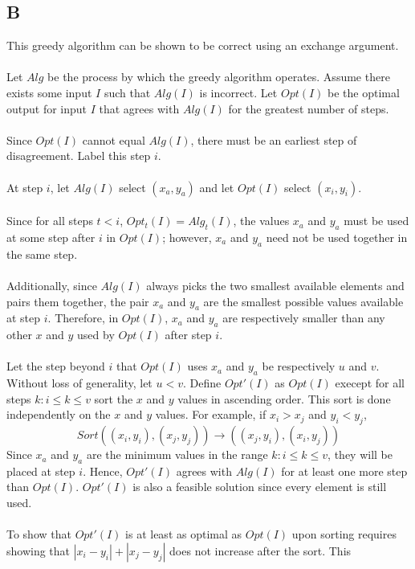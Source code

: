 \documentclass[12pt]{article}
\begin{document}
\subsection*{B}
This greedy algorithm can be shown to be correct using an
exchange argument.\\\\
Let $Alg$ be the process by which the greedy algorithm operates.
Assume there exists some input $I$ such that $Alg(I)$ is incorrect.
Let $Opt(I)$ be the optimal output for input $I$ that agrees with
$Alg(I)$ for the greatest number of steps.\\\\
Since $Opt(I)$ cannot equal $Alg(I)$, there must be an earliest
step of disagreement.  Label this step $i$.\\\\
At step $i$, let $Alg(I)$ select $(x_a, y_a)$ and let $Opt(I)$ select
$(x_i,y_i)$.\\\\
Since for all steps $t < i$, $Opt_t(I) = Alg_t(I)$, the values $x_a$ and
$y_a$ must be used at some step after $i$ in $Opt(I)$; however, $x_a$ and
$y_a$ need not be used together in the same step.\\\\
Additionally, since $Alg(I)$ always picks the two smallest available
elements and pairs them together, the pair $x_a$ and $y_a$ are the smallest
possible values available at step $i$.  Therefore, in $Opt(I)$, $x_a$ and
$y_a$ are respectively smaller than any other $x$ and $y$ used by $Opt(I)$
after step $i$.\\\\
Let the step beyond $i$ that $Opt(I)$ uses
$x_a$ and $y_a$ be respectively $u$ and $v$.  Without loss of generality,
let $u < v$.  Define $Opt'(I)$ as $Opt(I)$ execept for all steps $k: i \leq 
k \leq v$ sort the $x$ and $y$ values in ascending order.  This sort is done
independently on the $x$ and $y$ values.  For example, if $x_i > x_j$ and
$y_i < y_j$, \[Sort((x_i,y_i),(x_j,y_j))\to((x_j,y_i),(x_i,y_j))\]
Since $x_a$ and $y_a$
are the minimum values in the range $k: i \leq k \leq v$, they will be placed
at step $i$.  Hence, $Opt'(I)$ agrees with $Alg(I)$ for at least one more
step than $Opt(I)$.  $Opt'(I)$ is also a feasible solution since every element
is still used.\\\\
To show that $Opt'(I)$ is at least as optimal as $Opt(I)$ upon sorting requires
showing that $|x_i - y_i| + |x_j - y_j|$ does not increase after the sort.  This
\end{document}
